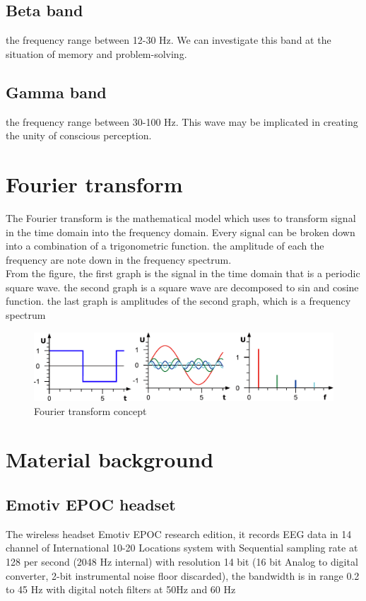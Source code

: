 \subsection{Beta band} the frequency range between 12-30 Hz. We can investigate this band at the situation of memory and problem-solving.

\subsection{Gamma band}the frequency range between 30-100 Hz. This wave may be implicated in creating the unity of conscious perception. 

\section{Fourier transform}
The Fourier transform is the mathematical model which uses to transform signal in the time domain into the frequency domain. Every signal can be broken down into a combination of a trigonometric function.  the amplitude of each the frequency are note down in the frequency spectrum. \\
From the figure, the first graph is the signal in the time domain that is a periodic square wave. the second graph is a square wave are decomposed to sin and cosine function. the last graph is amplitudes of the second graph, which is a frequency spectrum \\
\begin{figure}[ht]
	\centering
	\includegraphics[scale = 0.75]{chapter3/ft.pdf}
	\caption{Fourier transform concept\cite{ft}}
\end{figure}

\newpage
\section{Material background}

\subsection{Emotiv EPOC headset\cite{ref12}}

\hspace{1.5cm} The wireless headset Emotiv EPOC research edition, it records EEG data in 14 channel of International 10-20 Locations system with Sequential sampling rate at 128 per second (2048 Hz internal) with resolution 14 bit (16 bit Analog to digital converter, 2-bit instrumental noise floor discarded), the bandwidth is in range 0.2 to 45 Hz with digital notch filters at 50Hz and 60 Hz

